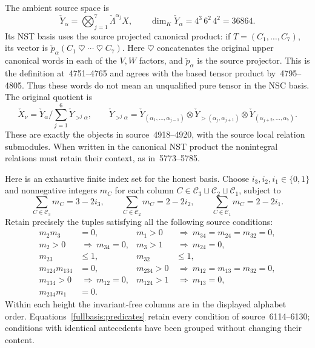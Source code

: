 The ambient source space is
\[
\check Y_\alpha=
 \bigotimes_{j=1}^{7}\check\Lambda^{\alpha_j}X,
\qquad \dim_K\check Y_\alpha=4^3\,6^2\,4^2=36864.
\]
Its NST basis uses the source projected canonical product: if
$T=(C_1,\ldots,C_7)$, its vector is
$\check p_\alpha(C_1\mathbin\heartsuit\cdots\mathbin\heartsuit C_7)$.
Here $\heartsuit$ concatenates the original upper canonical words in each
of the $V,W$ factors, and $\check p_\alpha$ is the source projector.
This is the definition at~4751--4765 and agrees with the based tensor
product by~4795--4805.  Thus these words do not mean an unqualified pure
tensor in the NSC basis.  The original quotient is
\[
 \check X_\nu=\check Y_\alpha/\sum_{j=1}^{6}\check Y_{>^j\alpha},
 \qquad
 \check Y_{>^j\alpha}=
 \check Y_{(\alpha_1,\ldots,\alpha_{j-1})}\otimes
 \check Y_{>(\alpha_j,\alpha_{j+1})}\otimes
 \check Y_{(\alpha_{j+2},\ldots,\alpha_7)}.
\]
These are exactly the objects in source~4918--4920, with the source local
relation submodules.  When written in the canonical NST product the
nonintegral relations must retain their context, as in~5773--5785.

Here is an exhaustive finite index set for the honest basis.  Choose
$i_3,i_2,i_1\in\{0,1\}$ and nonnegative integers $m_C$ for each column
$C\in\mathcal C_3\sqcup\mathcal C_2\sqcup\mathcal C_1$, subject to
\begin{equation}\label{fullbasis:counts}
 \sum_{C\in\mathcal C_3}m_C=3-2i_3,\qquad
 \sum_{C\in\mathcal C_2}m_C=2-2i_2,\qquad
 \sum_{C\in\mathcal C_1}m_C=2-2i_1.
\end{equation}
Retain precisely the tuples satisfying all the following source
conditions:
\begin{align}
 m_2m_3&=0,&
 m_1>0&\ \Longrightarrow\ m_{34}=m_{24}=m_{32}=0,\nonumber\\
 m_2>0&\ \Longrightarrow\ m_{34}=0,&
 m_3>1&\ \Longrightarrow\ m_{24}=0,\nonumber\\
 m_{23}&\leq1,&m_{32}&\leq1,\nonumber\\
 m_{124}m_{134}&=0,&
 m_{234}>0&\ \Longrightarrow\ m_{12}=m_{13}=m_{32}=0,\nonumber\\
 m_{134}>0&\ \Longrightarrow\ m_{12}=0,&
 m_{124}>1&\ \Longrightarrow\ m_{13}=0,\nonumber\\
 m_{234}m_1&=0.&&\label{fullbasis:predicates}
\end{align}
Within each height the invariant-free columns are in the displayed
alphabet order.  Equations~\eqref{fullbasis:predicates} retain every
condition of source~6114--6130; conditions with identical antecedents
have been grouped without changing their content.

